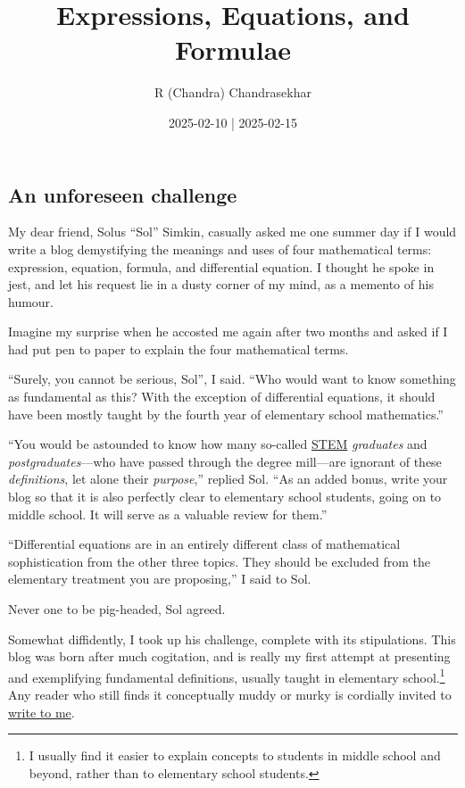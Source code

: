 \documentclass[
  a4paper,
]{article}
\title{Expressions, Equations, and Formulae}
\author{R (Chandra) Chandrasekhar}
\date{2025-02-10 | 2025-02-15}
\begin{document}
\maketitle

\thispagestyle{empty}


\subsection{An unforeseen challenge}\label{an-unforeseen-challenge}

My dear friend, Solus ``Sol'' Simkin, casually asked me one summer day
if I would write a blog demystifying the meanings and uses of four
mathematical terms: expression, equation, formula, and differential
equation. I thought he spoke in jest, and let his request lie in a dusty
corner of my mind, as a memento of his humour.

Imagine my surprise when he accosted me again after two months and asked
if I had put pen to paper to explain the four mathematical terms.

``Surely, you cannot be serious, Sol'', I said. ``Who would want to know
something as fundamental as this? With the exception of differential
equations, it should have been mostly taught by the fourth year of
elementary school mathematics.''

``You would be astounded to know how many so-called
\href{https://en.wikipedia.org/wiki/Science,_technology,_engineering,_and_mathematics}{STEM}
\emph{graduates} and \emph{postgraduates}---who have passed through the
degree mill---are ignorant of these \emph{definitions}, let alone their
\emph{purpose},'' replied Sol. ``As an added bonus, write your blog so
that it is also perfectly clear to elementary school students, going on
to middle school. It will serve as a valuable review for them.''

``Differential equations are in an entirely different class of
mathematical sophistication from the other three topics. They should be
excluded from the elementary treatment you are proposing,'' I said to
Sol.

Never one to be pig-headed, Sol agreed.

Somewhat diffidently, I took up his challenge, complete with its
stipulations. This blog was born after much cogitation, and is really my
first attempt at presenting and exemplifying fundamental definitions,
usually taught in elementary school.\footnote{I usually find it easier
  to explain concepts to students in middle school and beyond, rather
  than to elementary school students.} Any reader who still finds it
conceptually muddy or murky is cordially invited to
\href{mailto:feedback.swanlotus@gmail.com}{write to me}.
\end{document}
